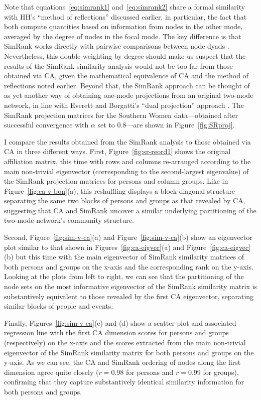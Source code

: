 \documentclass[a4paper,fleqn]{cas-sc}
\begin{document}
Note that equations~\ref{eq:simrank1} and~\ref{eq:simrank2} share a formal similarity with HH's ``method of reflections'' discussed earlier, in particular, the fact that both compute quantities based on information from nodes in the other mode, averaged by the degree of nodes in the focal mode. The key difference is that SimRank works directly with pairwise comparisons between node dyads \citep{jeh2002simrank}. Nevertheless, this double weighting by degree should make us suspect that the results of the SimRank similarity analysis would not be too far from those obtained via CA, given the mathematical equivalence of CA and the method of reflections noted earlier. Beyond that, the SimRank approach can be thought of as yet another way of obtaining one-mode projections from an original two-mode network, in line with Everett and Borgatti's ``dual projection'' approach \citep{everett2013dual}. The SimRank projection matrices for the Southern Women data---obtained after successful convergence with $\alpha$ set to $0.8$---are shown in Figure~\ref{fig:SRproj}. 

I compare the results obtained from the SimRank analysis to those obtained via CA in three different ways. First, Figure~\ref{fig:sr-reord1} shows the original affiliation matrix, this time with rows and columns re-arranged according to the main non-trivial eigenvector (corresponding to the second-largest eigenvalue) of the SimRank projection matrices for persons and column groups. Like in Figure~\ref{fig:ca-v-bon}(a), this reshuffling displays a block-diagonal structure separating the same two blocks of persons and groups as that revealed by CA, suggesting that CA and SimRank uncover a similar underlying partitioning of the two-mode network's community structure. 

Second, Figure~\ref{fig:sim-v-ca}(a) and Figure~\ref{fig:sim-v-ca}(b) show an eigenvector plot similar to that shown in Figures~\ref{fig:ca-eigvec}(a) and Figure~\ref{fig:ca-eigvec}(b) but this time with the main eigenvector of SimRank similarity matrices of both persons and groups on the x-axis and the corresponding rank on the y-axis. Looking at the plots from left to right, we can see that the partitioning of the node sets on the most informative eigenvector of the SimRank similarity matrix is substantively equivalent to those revealed by the first CA eigenvector, separating similar blocks of people and events. 

Finally, Figures~\ref{fig:sim-v-ca}(c) and (d) show a scatter plot and associated regression line with the first CA dimension scores for persons and groups (respectively) on the x-axis and the scores extracted from the main non-trivial eigenvector of the SimRank similarity matrix for both persons and groups on the y-axis. As we can see, the CA and SimRank ordering of nodes along the first dimension agree quite closely ($r = 0.98$ for persons and $r = 0.99$ for groups), confirming that they capture substantively identical similarity information for both persons and groups. 
\end{document}
